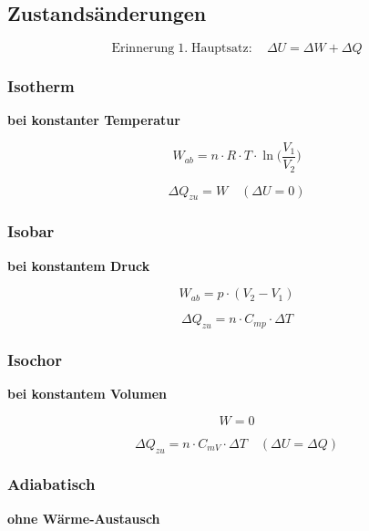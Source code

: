 \subsection{Zustandsänderungen}

$$ \mathrm{Erinnerung \; 1. \; Hauptsatz}: \quad  \Delta U = \Delta W + \Delta Q $$


\subsubsection{Isotherm}
\textbf{bei konstanter Temperatur}

\begin{minipage}{0.48\linewidth}
$$ \boxed{ W_{ab} = n \cdot R \cdot T \cdot \ln \Big( \frac{V_1}{V_2}  \Big) }  $$
\end{minipage}
\hfill
\begin{minipage}{0.48\linewidth}
$$ \boxed{ \Delta Q_{zu} = W } \quad  (\Delta U = 0) $$
\end{minipage}



\subsubsection{Isobar}
\textbf{bei konstantem Druck} \\

\begin{minipage}{0.48\linewidth}
$$ \boxed{ W_{ab} = p \cdot (V_2 -V_1)  }  $$
\end{minipage}
\hfill
\begin{minipage}{0.48\linewidth}
$$ \boxed{ \Delta Q_{zu} = n \cdot C_{mp} \cdot \Delta T } $$
\end{minipage}


\subsubsection{Isochor}
\textbf{bei konstantem Volumen}

\begin{minipage}{0.4\linewidth}
$$ \boxed{ W = 0 }  $$
\end{minipage}
\hfill
\begin{minipage}{0.58\linewidth}
$$ \boxed{ \Delta Q_{zu} = n \cdot C_{mV} \cdot \Delta T }  \quad  (\Delta U = \Delta Q) $$
\end{minipage}


\subsubsection{Adiabatisch}
\textbf{ohne Wärme-Austausch} \\



